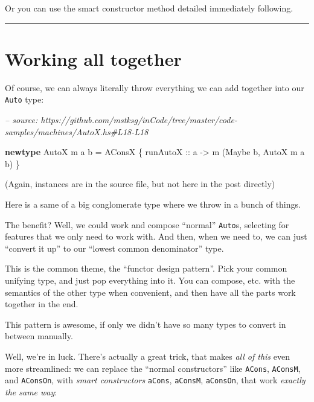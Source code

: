 \documentclass[]{article}
\newenvironment{Shaded}{}{}
\newcommand{\CommentTok}[1]{\textcolor[rgb]{0.38,0.63,0.69}{\textit{#1}}}
\newcommand{\DataTypeTok}[1]{\textcolor[rgb]{0.56,0.13,0.00}{#1}}
\newcommand{\FunctionTok}[1]{\textcolor[rgb]{0.02,0.16,0.49}{#1}}
\newcommand{\KeywordTok}[1]{\textcolor[rgb]{0.00,0.44,0.13}{\textbf{#1}}}
\newcommand{\NormalTok}[1]{#1}
\newcommand{\OtherTok}[1]{\textcolor[rgb]{0.00,0.44,0.13}{#1}}
\begin{document}
Or you can use the smart constructor method detailed immediately following.

\begin{center}\rule{0.5\linewidth}{\linethickness}\end{center}

\hypertarget{working-all-together}{%
\section{Working all together}\label{working-all-together}}

Of course, we can always literally throw everything we can add together into our
\texttt{Auto} type:

\begin{Shaded}
\begin{Highlighting}[]
\CommentTok{-- source: https://github.com/mstksg/inCode/tree/master/code-samples/machines/AutoX.hs#L18-L18}

\KeywordTok{newtype} \DataTypeTok{AutoX}\NormalTok{ m a b }\FunctionTok{=} \DataTypeTok{AConsX}\NormalTok{ \{}\OtherTok{ runAutoX ::}\NormalTok{ a }\OtherTok{->}\NormalTok{ m (}\DataTypeTok{Maybe}\NormalTok{ b, }\DataTypeTok{AutoX}\NormalTok{ m a b) \}}
\end{Highlighting}
\end{Shaded}

(Again, instances are in the source file, but not here in the post directly)

Here is a same of a big conglomerate type where we throw in a bunch of things.

The benefit? Well, we could work and compose ``normal'' \texttt{Auto}s,
selecting for features that we only need to work with. And then, when we need
to, we can just ``convert it up'' to our ``lowest common denominator'' type.

This is the common theme, the ``functor design pattern''. Pick your common
unifying type, and just pop everything into it. You can compose, etc. with the
semantics of the other type when convenient, and then have all the parts work
together in the end.

This pattern is awesome, if only we didn't have so many types to convert in
between manually.

Well, we're in luck. There's actually a great trick, that makes \emph{all of
this} even more streamlined: we can replace the ``normal constructors'' like
\texttt{ACons}, \texttt{AConsM}, and \texttt{AConsOn}, with \emph{smart
constructors} \texttt{aCons}, \texttt{aConsM}, \texttt{aConsOn}, that work
\emph{exactly the same way}:
\end{document}
